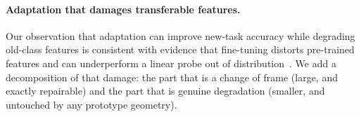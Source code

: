 \paragraph{Adaptation that damages transferable features.}
Our observation that adaptation can improve new-task accuracy while degrading
old-class features is consistent with evidence that fine-tuning distorts
pre-trained features and can underperform a linear probe out of
distribution~\citep{kumar2022lpft}. We add a decomposition of that damage: the
part that is a change of frame (large, and exactly repairable) and the part that
is genuine degradation (smaller, and untouched by any prototype geometry).

